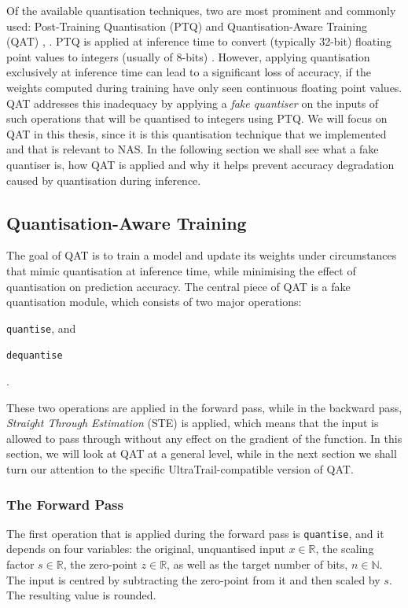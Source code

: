 \documentclass[11pt,a4paper, open=any]{scrbook}
\begin{document}
Of the available quantisation techniques, two are most prominent and commonly used: Post-Training Quantisation (PTQ) and Quantisation-Aware Training (QAT) \cite[431]{qat_survey}, \cite{jacob_qat}. 
PTQ is applied at inference time to convert (typically 32-bit) floating point values to integers (usually of 8-bits) \cite{pytorch_ptq}. However, applying quantisation exclusively at inference time can lead to a significant loss of accuracy, if the weights computed during training have only seen continuous floating point values. QAT addresses this inadequacy by applying a \textit{fake quantiser} on the inputs of such operations that will be quantised to integers using PTQ. We will focus on QAT in this thesis, since it is this quantisation technique that we implemented and that is relevant to NAS. In the following section we shall see what a fake quantiser is, how QAT is applied and why it helps prevent accuracy degradation caused by quantisation during inference.

\subsection{Quantisation-Aware Training}\label{sec:qat}
The goal of QAT is to train a model and update its weights under circumstances that mimic quantisation at inference time, while minimising the effect of quantisation on prediction accuracy. The central piece of QAT is a fake quantisation module, which consists of two major operations:

\begin{enumerate*}[label=(\roman*)]
	\item \texttt{quantise}, and
	\item \texttt{dequantise}
	
\end{enumerate*}.

These two operations are applied in the forward pass, while in the backward pass, \textit{Straight Through Estimation} (STE) is applied, which means that the input is allowed to pass through without any effect on the gradient of the function. In this section, we will look at QAT at a general level, while in the next section we shall turn our attention to the specific UltraTrail-compatible version of QAT.

\subsubsection{The Forward Pass}\label{subsec:fwd}
The first operation that is applied during the forward pass is \texttt{quantise}, and it depends on four variables: the original, unquantised input $x \in \mathbb{R}$, the scaling factor $s \in \mathbb{R}$, the zero-point $z \in \mathbb{R}$, as well as the target number of bits, $n \in \mathbb{N}$. The input is centred by subtracting the zero-point from it and then scaled by $s$. The resulting value is rounded.
\end{document}
